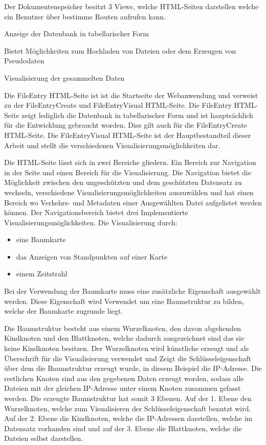\documentclass[
    fontsize=12pt,
    headings=small,
    parskip=half,           %
    bibliography=totoc,
    numbers=noenddot,       %
    open=any,               %
    ]{scrreprt}
\begin{document}
Der Dokumentenspeicher besitzt 3 Views, welche HTML-Seiten darstellen welche ein Benutzer über bestimme Routen aufrufen kann. 

\begin{description}[style=nextline] 
\item[/FileEntry] Anzeige der Datenbank in tabellarischer Form
\item[/FileEntryCreate] Bietet Möglichkeiten zum Hochladen von Dateien oder dem Erzeugen von Pseudodaten
\item[/FileEntryVisual] Visualisierung der gesammelten Daten
\end{description}

Die FileEntry HTML-Seite ist ist die Startseite der Webanwendung und verweist zu der FileEntryCreate und FileEntryVisual HTML-Seite.
Die FileEntry HTML-Seite zeigt lediglich die Datenbank in tabellarischer Form und ist hauptsächlich für die Entwicklung gebraucht worden. 
Dies gilt auch für die FileEntryCreate HTML-Seite. 
Die FileEntryVisual HTML-Seite ist der Hauptbestandteil dieser Arbeit und stellt die verschiedenen Visualisierungsmöglichkeiten dar.

Die HTML-Seite lässt sich in zwei Bereiche gliedern.
Ein Bereich zur Navigation in der Seite und einen Bereich für die Visualisierung.
Die Navigation bietet die Möglichkeit zwischen den ungeschützten und dem geschützten Datensatz zu wechseln, verschiedene Visualisierungsmöglichkeiten auszuwählen und hat einen Bereich wo Verkehrs- und Metadaten einer Ausgewählten Datei aufgelistet werden können.
Der Navigationsbereich bietet drei Implementierte Visualisierungsmöglichkeiten.
Die Visualisierung durch:
\begin{itemize}
\item eine Baumkarte
\item das Anzeigen von Standpunkten auf einer Karte
\item einem Zeitstrahl
\end{itemize} 
Bei der Verwendung der Baumkarte muss eine zusätzliche Eigenschaft ausgewählt werden.
Diese Eigenschaft wird Verwendet um eine Baumstruktur zu bilden, welche der Baumkarte zugrunde liegt.

Die Baumstruktur besteht aus einem Wurzelknoten, den davon abgehenden Kindknoten und den Blattknoten, welche dadurch ausgezeichnet sind das sie keine Kindknoten besitzen. 
Der Wurzelknoten wird künstliche erzeugt und als Überschrift für die Visualisierung verwendet und Zeigt die Schlüsseleigenschaft über dem die Baumstruktur erzeugt wurde, in diesem Beispiel die IP-Adresse.
Die restlichen Knoten sind aus den gegebenen Daten erzeugt worden, sodass alle Dateien mit der gleichen IP-Adresse unter einem Knoten zusammen gefasst werden.
Die erzeugte Baumstruktur hat somit 3 Ebenen. 
Auf der 1. Ebene den Wurzelknoten, welche zum Visualisieren der Schlüsseleigenschaft benutzt wird. 
Auf der 2. Ebene die Kindknoten, welche die IP-Adressen darstellen, welche im Datensatz vorhanden sind und auf der 3. Ebene die Blattknoten, welche die Dateien selbst darstellen.
\end{document}
